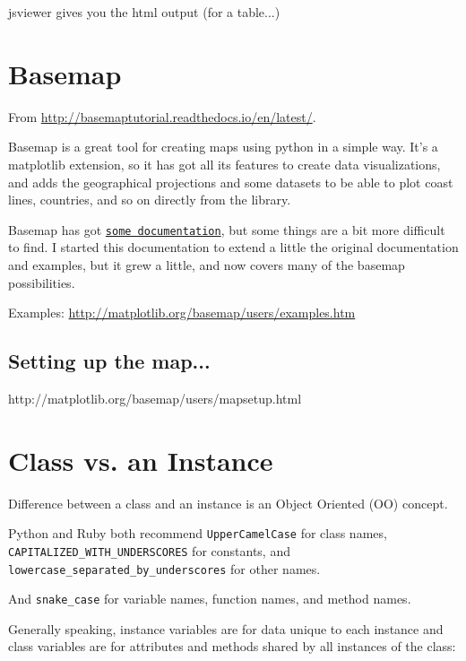 \documentclass[11pt,a4paper]{article}
\begin{document}
jsviewer gives you the html output (for a table...)





\newpage
\section{Basemap}
From
\href{http://basemaptutorial.readthedocs.io/en/latest/}{http://basemaptutorial.readthedocs.io/en/latest/}.

\smallskip \smallskip
\noindent 
Basemap is a great tool for creating maps using python in a simple
way. It’s a matplotlib extension, so it has got all its features to
create data visualizations, and adds the geographical projections and
some datasets to be able to plot coast lines, countries, and so on
directly from the library.

\smallskip \smallskip
\noindent 
Basemap has got
\href{http://matplotlib.org/basemap/index.html}{\tt some
documentation}, but some things are a bit more difficult to find. I
started this documentation to extend a little the original
documentation and examples, but it grew a little, and now covers many
of the basemap possibilities.

\smallskip \smallskip
\noindent
Examples:
\href{http://matplotlib.org/basemap/users/examples.html}{http://matplotlib.org/basemap/users/examples.htm}


    \subsection{Setting up the map... }
    http://matplotlib.org/basemap/users/mapsetup.html




\newpage
\section{Class vs. an Instance}
Difference between a class and an instance is an Object Oriented (OO)
concept.

Python and Ruby both recommend {\tt UpperCamelCase} for class names,
{\tt CAPITALIZED\_WITH\_UNDERSCORES} for constants, and {\tt
lowercase\_separated\_by\_underscores} for other names.  

And {\tt snake\_case} for variable names, function names, and method names. 

Generally speaking, instance variables are for data unique to each instance and class variables are for attributes and methods shared by all instances of the class:
\end{document}
